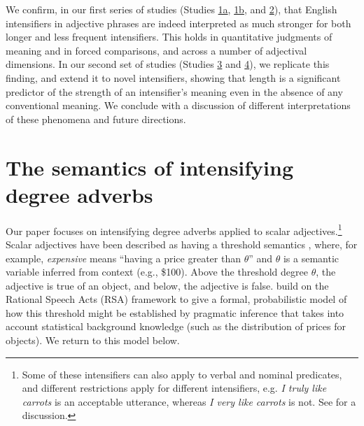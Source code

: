 \documentclass[10pt,letterpaper]{article}
\newcommand{\w}[1]{\emph{#1}}
\begin{document}
We confirm, in our first series of studies (Studies \hyperref[sec:study1a]{1a}, \hyperref[sec:study1b]{1b}, and \hyperref[sec:study2]{2}), that English intensifiers in adjective phrases are indeed interpreted as much stronger for both longer and less frequent intensifiers.
This holds in quantitative judgments of meaning and in forced comparisons, and across a number of adjectival dimensions.
In our second set of studies (Studies \hyperref[sec:study3]{3} and \hyperref[sec:study4]{4}), we replicate this finding, and extend it to novel intensifiers, showing that length is a significant predictor of the strength of an intensifier’s meaning even in the absence of any conventional meaning.
We conclude with a discussion of different interpretations of these phenomena and future directions.

\section{The semantics of intensifying degree adverbs}

Our paper focuses on intensifying degree adverbs applied to scalar adjectives.\footnote{
  Some of these intensifiers can also apply to verbal and nominal predicates, and different restrictions apply for different intensifiers, e.g. \w{I truly like carrots} is an acceptable utterance, whereas \w{I very like carrots} is not. See  for a discussion.
 }
Scalar adjectives have been described as having a threshold semantics \cite{kennedy}, where, for example, \w{expensive} means ``having a price greater than $\theta$'' and $\theta$ is a semantic variable inferred from context (e.g., \$100). Above the threshold degree $\theta$, the adjective is true of an object, and below, the adjective is false.  build on the Rational Speech Acts (RSA) framework \cite{frank,goodman} to give a formal, probabilistic model of how this threshold might be established by pragmatic inference that takes into account statistical background knowledge (such as the distribution of prices for objects). We return to this model below.
\end{document}
